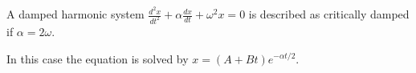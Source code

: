  A damped harmonic system $ \frac{d^2 x}{dt^2} + \alpha \frac{dx}{dt} 
+ \omega ^2 x = 0  $ is described as critically damped if
$ \alpha = 2 \omega . $ 
\par
In this case the equation is solved by 
$ x = (A + Bt) e^{- \alpha t / 2} . $
